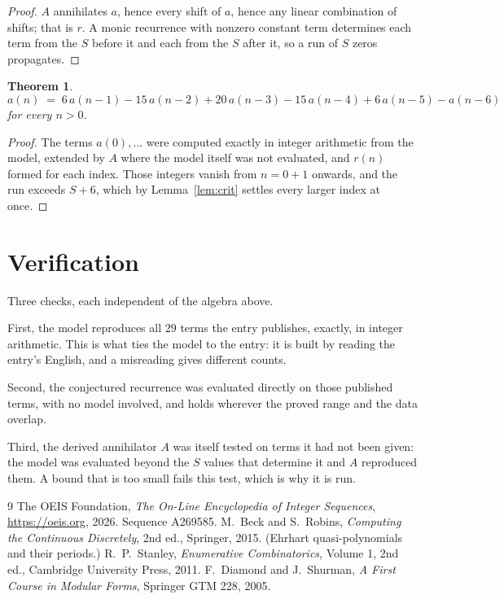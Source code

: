 \documentclass[11pt,a4paper]{article}
\theoremstyle{plain}
\newtheorem{theorem}{Theorem}
\theoremstyle{definition}
\begin{document}
\begin{proof}
$A$ annihilates $a$, hence every shift of $a$, hence any linear combination of shifts; that is
$r$. A monic recurrence with nonzero constant term determines each term from the $S$ before it
and each from the $S$ after it, so a run of $S$ zeros propagates.
\end{proof}

\begin{theorem}
\[
a(n)\;=\;6\,a(n-1) - 15\,a(n-2) + 20\,a(n-3) - 15\,a(n-4) + 6\,a(n-5) - a(n-6)
\]
for every $n>0$.
\end{theorem}

\begin{proof}
The terms $a(0),\dots$ were computed exactly in integer arithmetic from the model, extended by
$A$ where the model itself was not evaluated, and $r(n)$ formed for each index. Those integers
vanish from $n=0+1$ onwards, and the run exceeds $S+6$, which by
Lemma~\ref{lem:crit} settles every larger index at once.
\end{proof}

\section{Verification}

Three checks, each independent of the algebra above.

First, the model reproduces all $29$ terms the entry publishes, exactly, in integer
arithmetic. This is what ties the model to the entry: it is built by reading the entry's
English, and a misreading gives different counts.

Second, the conjectured recurrence was evaluated directly on those published terms, with no
model involved, and holds wherever the proved range and the data overlap.

Third, the derived annihilator $A$ was itself tested on terms it had not been given: the model
was evaluated beyond the $S$ values that determine it and $A$ reproduced them. A bound that is
too small fails this test, which is why it is run.

\begin{thebibliography}{9}
 The OEIS Foundation, \emph{The On-Line Encyclopedia of Integer
Sequences}, \url{https://oeis.org}, 2026. Sequence A269585.
 M.~Beck and S.~Robins, \emph{Computing the Continuous Discretely},
2nd ed., Springer, 2015. (Ehrhart quasi-polynomials and their periods.)
 R.~P.~Stanley, \emph{Enumerative Combinatorics}, Volume 1, 2nd ed.,
Cambridge University Press, 2011.
 F.~Diamond and J.~Shurman, \emph{A First Course in Modular Forms},
Springer GTM 228, 2005.
\end{thebibliography}
\end{document}
